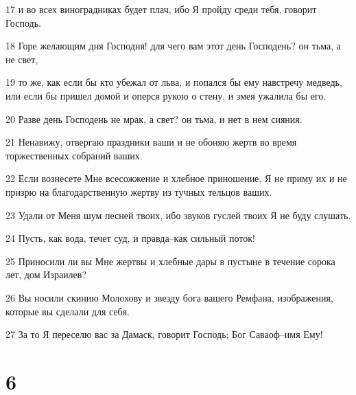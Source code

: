\par 17 и во всех виноградниках будет плач, ибо Я пройду среди тебя, говорит Господь.
\par 18 Горе желающим дня Господня! для чего вам этот день Господень? он тьма, а не свет,
\par 19 то же, как если бы кто убежал от льва, и попался бы ему навстречу медведь, или если бы пришел домой и оперся рукою о стену, и змея ужалила бы его.
\par 20 Разве день Господень не мрак, а свет? он тьма, и нет в нем сияния.
\par 21 Ненавижу, отвергаю праздники ваши и не обоняю жертв во время торжественных собраний ваших.
\par 22 Если вознесете Мне всесожжение и хлебное приношение, Я не приму их и не призрю на благодарственную жертву из тучных тельцов ваших.
\par 23 Удали от Меня шум песней твоих, ибо звуков гуслей твоих Я не буду слушать.
\par 24 Пусть, как вода, течет суд, и правда--как сильный поток!
\par 25 Приносили ли вы Мне жертвы и хлебные дары в пустыне в течение сорока лет, дом Израилев?
\par 26 Вы носили скинию Молохову и звезду бога вашего Ремфана, изображения, которые вы сделали для себя.
\par 27 За то Я переселю вас за Дамаск, говорит Господь; Бог Саваоф--имя Ему!

\chapter{6}

